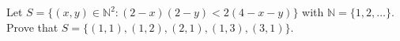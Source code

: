 Let $S=\{(x,y)\in\mathbb N^2:(2-x)(2-y)<2(4-x-y)\}$ with $\mathbb N=\{1,2,\dots\}$. Prove that $S=\{(1,1),(1,2),(2,1),(1,3),(3,1)\}$.
